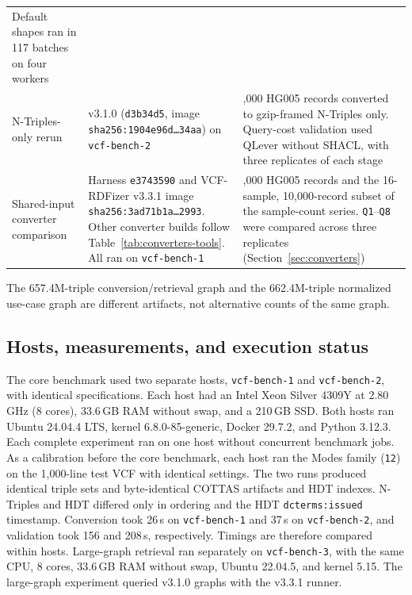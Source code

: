\documentclass[11pt]{article}
\newcommand{\rowsep}{\noalign{\vskip2pt{\color{black!22}\hrule height 0.4pt}\vskip2pt}}%
\begin{document}
\begin{table}[!htbp]
\begin{tabularx}{\textwidth}{@{}>{\raggedright\arraybackslash}m{}>{\raggedright\arraybackslash}m{}>{\raggedright\arraybackslash}X@{}}
Default shapes ran in 117 batches on four workers\\
\rowsep
N-Triples-only rerun & v3.1.0 (\texttt{d3b34d5}, image \texttt{sha256:1904e96d\ldots34aa}) on \texttt{vcf-bench-2} & 100,000 HG005 records converted to gzip-framed N-Triples only.
Query-cost validation used QLever without SHACL, with three replicates of each stage\\
\rowsep
Shared-input converter comparison & Harness \texttt{e3743590} and VCF-RDFizer v3.3.1 image \texttt{sha256:3ad71b1a\ldots2993}.
Other converter builds follow Table~\ref{tab:converters-tools}.
All ran on \texttt{vcf-bench-1} & 100,000 HG005 records and the 16-sample, 10,000-record subset of the sample-count series.
\texttt{Q1}--\texttt{Q8} were compared across three replicates (Section~\ref{sec:converters})\\
\bottomrule
\end{tabularx}
\end{table}

The 657.4M-triple conversion/retrieval graph and the 662.4M-triple normalized use-case graph are different artifacts, not alternative counts of the same graph.

\subsection{Hosts, measurements, and execution status}\label{subsec:repro-hosts}
The core benchmark used two separate hosts, \texttt{vcf-bench-1} and \texttt{vcf-bench-2}, with identical specifications.
Each host had an Intel Xeon Silver 4309Y at 2.80\,GHz (8 cores), 33.6\,GB RAM without swap, and a 210\,GB SSD.
Both hosts ran Ubuntu 24.04.4 LTS, kernel 6.8.0-85-generic, Docker 29.7.2, and Python 3.12.3.
Each complete experiment ran on one host without concurrent benchmark jobs.
As a calibration before the core benchmark, each host ran the Modes family (\texttt{12}) on the 1,000-line test VCF with identical settings.
The two runs produced identical triple sets and byte-identical COTTAS artifacts and HDT indexes.
N-Triples and HDT differed only in ordering and the HDT \texttt{dcterms:issued} timestamp.
Conversion took 26\,s on \texttt{vcf-bench-1} and 37\,s on \texttt{vcf-bench-2}, and validation took 156 and 208\,s, respectively.
Timings are therefore compared within hosts.
Large-graph retrieval ran separately on \texttt{vcf-bench-3}, with the same CPU, 8 cores, 33.6\,GB RAM without swap, Ubuntu 22.04.5, and kernel 5.15.
The large-graph experiment queried v3.1.0 graphs with the v3.3.1 runner.
\end{document}
